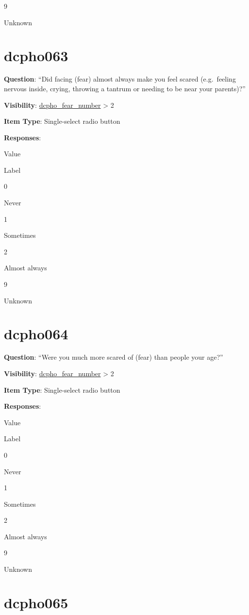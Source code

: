 \documentclass[]{book}
\begin{document}
9

Unknown

\hypertarget{dcpho063}{%
\section{dcpho063}\label{dcpho063}}

\textbf{Question}: ``Did facing (fear) almost always make you feel scared (e.g.~feeling nervous inside, crying, throwing a tantrum or needing to be near your parents)?''

\textbf{Visibility}: \protect\hyperlink{dcpho_fear_number}{dcpho\_fear\_number} \textgreater{} 2

\textbf{Item Type}: Single-select radio button

\textbf{Responses}:

Value

Label

0

Never

1

Sometimes

2

Almost always

9

Unknown

\hypertarget{dcpho064}{%
\section{dcpho064}\label{dcpho064}}

\textbf{Question}: ``Were you much more scared of (fear) than people your age?''

\textbf{Visibility}: \protect\hyperlink{dcpho_fear_number}{dcpho\_fear\_number} \textgreater{} 2

\textbf{Item Type}: Single-select radio button

\textbf{Responses}:

Value

Label

0

Never

1

Sometimes

2

Almost always

9

Unknown

\hypertarget{dcpho065}{%
\section{dcpho065}\label{dcpho065}}
\end{document}
